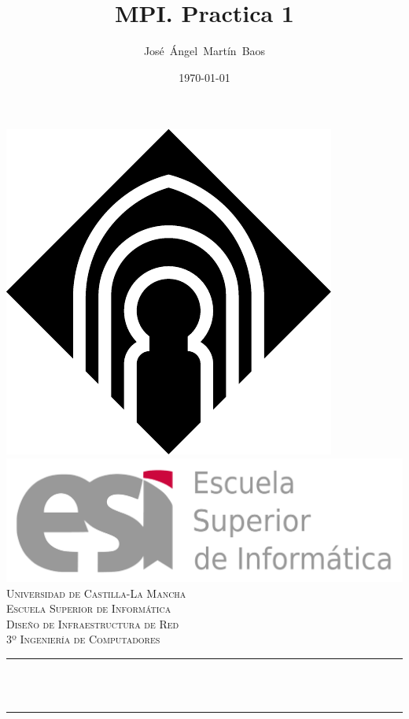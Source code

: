 \documentclass[11pt]{article}
\title{MPI. Practica 1}							%
\author{José~Ángel~Martín~Baos}							%
\date{\today}											%
\makeatletter
\let\thetitle\@title
\makeatother
\begin{document}

\begin{titlepage}
	\centering
    \includegraphics[scale = 0.40]{uclm_logo.pdf}\\[1.0 cm]	%
    \includegraphics[scale = 0.25]{esi.pdf}\\[1.0 cm]
    \textsc{\LARGE Universidad de Castilla-La Mancha}\\[0.5 cm]	%
    \textsc{\LARGE Escuela Superior de Informática}\\[2.0 cm]
	\textsc{\Large Diseño de Infraestructura de Red}\\[0.5 cm]				%
	\textsc{\large 3º Ingeniería de Computadores}\\[0.5 cm]						%
	\rule{\linewidth}{0.2 mm} \\[0.4 cm]
	{ \huge \bfseries \thetitle}\\
	\rule{\linewidth}{0.2 mm} \\[1.5 cm]
	

\end{titlepage}
\end{document}
